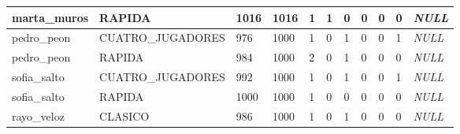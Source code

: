 \begin{center}
\begin{longtable}{|L{42.0pt}|L{78.5pt}|L{20.1pt}|L{39.0pt}|L{37.5pt}|L{40.2pt}|L{26.9pt}|L{31.8pt}|L{29.1pt}|L{35.2pt}|L{42.4pt}|}
marta\_\allowbreak{}muros & RAPIDA & 1016 & 1016 & 1 & 1 & 0 & 0 & 0 & 0 & \textit{NULL} \\ \hline
pedro\_\allowbreak{}peon & CUATRO\_\allowbreak{}JUGADORES & 976 & 1000 & 1 & 0 & 1 & 0 & 0 & 1 & \textit{NULL} \\ \hline
pedro\_\allowbreak{}peon & RAPIDA & 984 & 1000 & 2 & 0 & 1 & 0 & 0 & 0 & \textit{NULL} \\ \hline
sofia\_\allowbreak{}salto & CUATRO\_\allowbreak{}JUGADORES & 992 & 1000 & 1 & 0 & 1 & 0 & 0 & 1 & \textit{NULL} \\ \hline
sofia\_\allowbreak{}salto & RAPIDA & 1000 & 1000 & 1 & 0 & 0 & 0 & 0 & 0 & \textit{NULL} \\ \hline
rayo\_\allowbreak{}veloz & CLASICO & 986 & 1000 & 1 & 0 & 1 & 0 & 0 & 0 & \textit{NULL} \\ \hline
\end{longtable}
\end{center}
